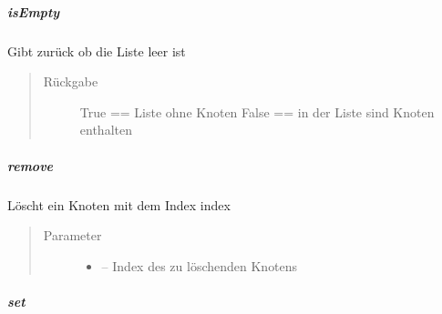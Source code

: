 \documentclass[letterpaper,10pt,ngerman]{sphinxmanual}
\begin{document}
\subparagraph{isEmpty}
\label{\detokenize{com/linuxluigi/edu/list/BinaryLinkedList:isempty}}

\begin{fulllineitems}
\label{\detokenize{com/linuxluigi/edu/list/BinaryLinkedList:com.linuxluigi.edu.list.BinaryLinkedList.isEmpty()}}
Gibt zurück ob die Liste leer ist
\begin{quote}\begin{description}
\item[{Rückgabe}] \leavevmode
True == Liste ohne Knoten False == in der Liste sind Knoten enthalten

\end{description}\end{quote}

\end{fulllineitems}



\subparagraph{remove}
\label{\detokenize{com/linuxluigi/edu/list/BinaryLinkedList:remove}}

\begin{fulllineitems}
\label{\detokenize{com/linuxluigi/edu/list/BinaryLinkedList:com.linuxluigi.edu.list.BinaryLinkedList.remove(int)}}
Löscht ein Knoten mit dem Index index
\begin{quote}\begin{description}
\item[{Parameter}] \leavevmode\begin{itemize}
\item {} 
 -- Index des zu löschenden Knotens

\end{itemize}

\end{description}\end{quote}

\end{fulllineitems}



\subparagraph{set}
\label{\detokenize{com/linuxluigi/edu/list/BinaryLinkedList:set}}
\end{document}
